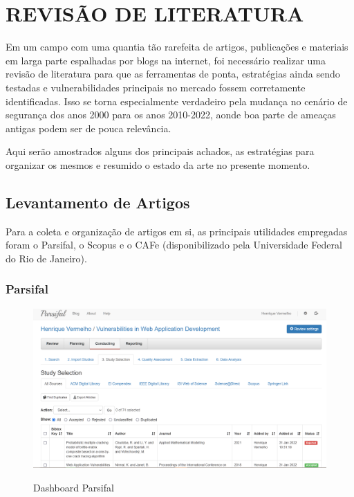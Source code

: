 \chapter{REVISÃO DE LITERATURA}
\label{chp:capitulo3}
Em um campo com uma quantia tão rarefeita de artigos, publicações e materiais em larga parte espalhadas por blogs na internet, foi necessário realizar uma revisão de literatura para que as ferramentas de ponta, estratégias ainda sendo testadas e vulnerabilidades principais no mercado fossem corretamente identificadas. Isso se torna especialmente verdadeiro pela mudança no cenário de segurança dos anos 2000 para os anos 2010-2022, aonde boa parte de ameaças antigas podem ser de pouca relevância.

Aqui serão amostrados alguns dos principais achados, as estratégias para organizar os mesmos e resumido o estado da arte no presente momento.

\section{Levantamento de Artigos}

Para a coleta e organização de artigos em si, as principais utilidades empregadas foram o Parsifal, o Scopus e o CAFe (disponibilizado pela Universidade Federal do Rio de Janeiro). 

\subsection{Parsifal}

\begin{figure}[ht]
    \centering
    \caption{Dashboard Parsifal}
    \includegraphics[width=14cm]{figuras/parsifal.png} 
    \label{fig:internet} 
\end{figure}

